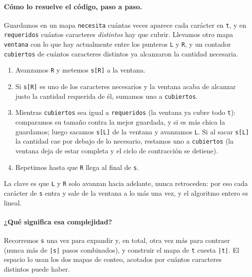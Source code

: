 \paragraph{Cómo lo resuelve el código, paso a paso.} Guardamos en un mapa
\texttt{necesita} cuántas veces aparece cada carácter en \texttt{t}, y en
\texttt{requeridos} cuántos caracteres \emph{distintos} hay que cubrir.
Llevamos otro mapa \texttt{ventana} con lo que hay actualmente entre los
punteros \texttt{L} y \texttt{R}, y un contador \texttt{cubiertos} de
cuántos caracteres distintos ya alcanzaron la cantidad necesaria.
\begin{enumerate}
  \item Avanzamos \texttt{R} y metemos \texttt{s[R]} a la ventana.
  \item Si \texttt{s[R]} es uno de los caracteres necesarios y la ventana
        acaba de alcanzar justo la cantidad requerida de él, sumamos uno a
        \texttt{cubiertos}.
  \item Mientras \texttt{cubiertos} sea igual a \texttt{requeridos} (la
        ventana ya cubre todo \texttt{t}): comparamos su tamaño contra la
        mejor guardada, y si es más chica la guardamos; luego sacamos
        \texttt{s[L]} de la ventana y avanzamos \texttt{L}. Si al sacar
        \texttt{s[L]} la cantidad cae por debajo de lo necesario,
        restamos uno a \texttt{cubiertos} (la ventana deja de estar
        completa y el ciclo de contracción se detiene).
  \item Repetimos hasta que \texttt{R} llega al final de \texttt{s}.
\end{enumerate}
La clave es que \texttt{L} y \texttt{R} solo avanzan hacia adelante, nunca
retroceden: por eso cada carácter de \texttt{s} entra y sale de la ventana
a lo más una vez, y el algoritmo entero es lineal.




\paragraph{¿Qué significa esa complejidad?} Recorremos \texttt{s} una vez
para expandir y, en total, otra vez más para contraer (nunca más de
\texttt{|s|} pasos combinados), y construir el mapa de \texttt{t} cuesta
\texttt{|t|}. El espacio lo usan los dos mapas de conteo, acotados por
cuántos caracteres distintos puede haber.

